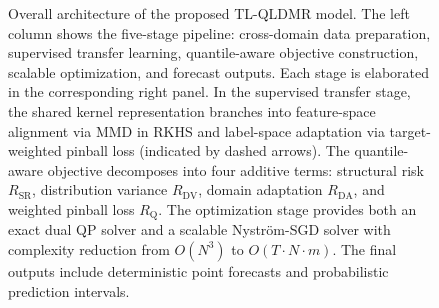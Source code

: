 \documentclass[a4paper]{cas-sc}
\begin{document}
\begin{figure}
\centering
\resizebox{\textwidth}{!}{}
\caption{Overall architecture of the proposed TL-QLDMR model. The left column shows the five-stage pipeline: cross-domain data preparation, supervised transfer learning, quantile-aware objective construction, scalable optimization, and forecast outputs. Each stage is elaborated in the corresponding right panel. In the supervised transfer stage, the shared kernel representation branches into feature-space alignment via MMD in RKHS and label-space adaptation via target-weighted pinball loss (indicated by dashed arrows). The quantile-aware objective decomposes into four additive terms: structural risk $R_{\mathrm{SR}}$, distribution variance $R_{\mathrm{DV}}$, domain adaptation $R_{\mathrm{DA}}$, and weighted pinball loss $R_{\mathrm{Q}}$. The optimization stage provides both an exact dual QP solver and a scalable Nystr\"om-SGD solver with complexity reduction from $O(N^3)$ to $O(T \cdot N \cdot m)$. The final outputs include deterministic point forecasts and probabilistic prediction intervals.}
\label{fig:framework}
\end{figure}
\end{document}
